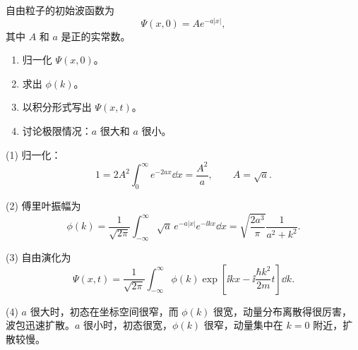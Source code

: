\begin{question}
自由粒子的初始波函数为
\[
\Psi(x,0)=Ae^{-a|x|},
\]
其中 $A$ 和 $a$ 是正的实常数。
\begin{enumerate}
\item 归一化 $\Psi(x,0)$。
\item 求出 $\phi(k)$。
\item 以积分形式写出 $\Psi(x,t)$。
\item 讨论极限情况：$a$ 很大和 $a$ 很小。
\end{enumerate}
\end{question}
\begin{solution}
(1) 归一化：
\[
1=2A^2\int_0^\infty e^{-2ax}\dd x=\frac{A^2}{a},
\qquad A=\sqrt a.
\]

(2) 傅里叶振幅为
\[
\phi(k)=\frac1{\sqrt{2\pi}}\int_{-\infty}^{\infty}\sqrt a\,e^{-a|x|}e^{-\ii kx}\dd x
=\sqrt{\frac{2a^3}{\pi}}\frac1{a^2+k^2}.
\]

(3) 自由演化为
\[
\Psi(x,t)=\frac1{\sqrt{2\pi}}\int_{-\infty}^{\infty}\phi(k)
\exp\left[\ii kx-\ii\frac{\hbar k^2}{2m}t\right]\dd k.
\]

(4) $a$ 很大时，初态在坐标空间很窄，而 $\phi(k)$ 很宽，动量分布离散得很厉害，波包迅速扩散。$a$ 很小时，初态很宽，$\phi(k)$ 很窄，动量集中在 $k=0$ 附近，扩散较慢。
\end{solution}

